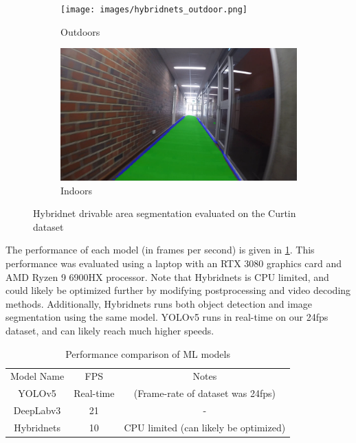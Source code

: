 \begin{figure}[b]
    \centering
    \begin{subfigure}{.48\textwidth}
        \centering
        \texttt{[image: images/hybridnets\_outdoor.png]}
        \caption{Outdoors}
    \end{subfigure}
    \quad
    \begin{subfigure}{.47\textwidth}
        \centering
        \includegraphics[width=\linewidth]{images/hybridnets_indoor.png}
        \caption{Indoors}
    \end{subfigure}
    \caption{Hybridnet drivable area segmentation evaluated on the Curtin dataset}
    \label{fig:hybridnets}
\end{figure}

The performance of each model (in frames per second) is given in \cref{table:model_fps}.
This performance was evaluated using a laptop with an RTX 3080 graphics card and AMD Ryzen 9 6900HX processor.
Note that Hybridnets is CPU limited, and could likely be optimized further by modifying postprocessing and video decoding methods.
Additionally,
Hybridnets runs both object detection and image segmentation using the same model.
YOLOv5 runs in real-time on our 24fps dataset, and can likely reach much higher speeds.

\begin{table}[H]
    \centering
    \begin{tabular}{c c c}
    Model Name & FPS & Notes \\
    YOLOv5 & Real-time & (Frame-rate of dataset was 24fps) \\
    DeepLabv3 & 21 & - \\
    Hybridnets & 10 & CPU limited (can likely be optimized) \\
    \end{tabular}
    \caption{Performance comparison of ML models}
    \label{table:model_fps}
\end{table}

